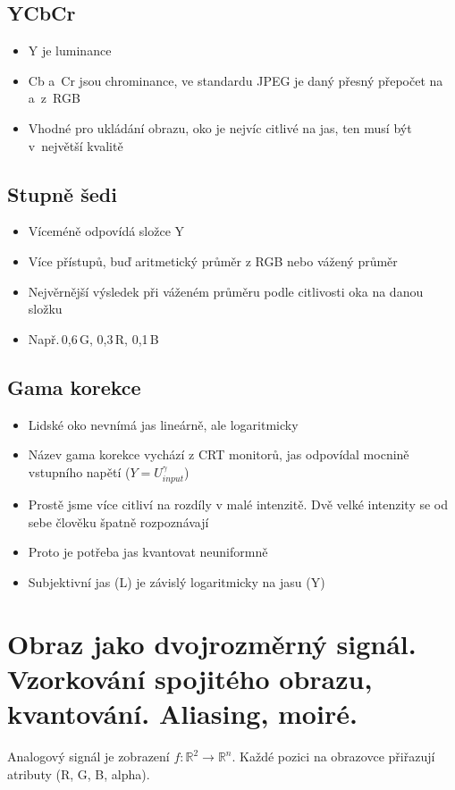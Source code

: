 \subsection{YCbCr}
\begin{itemize}
    \item Y je luminance
    \item Cb a~Cr jsou chrominance, ve standardu JPEG je daný přesný přepočet na a~z~RGB
    \item Vhodné pro ukládání obrazu, oko je nejvíc citlivé na jas, ten musí být v~největší kvalitě
\end{itemize}

\subsection{Stupně šedi}
\begin{itemize}
    \item Víceméně odpovídá složce Y
    \item Více přístupů, buď aritmetický průměr z RGB nebo vážený průměr
    \item Nejvěrnější výsledek při váženém průměru podle citlivosti oka na danou složku
    \item Např.\,0,6\,G, 0,3\,R, 0,1\,B
\end{itemize}

\subsection{Gama korekce}
\begin{itemize}
    \item Lidské oko nevnímá jas lineárně, ale logaritmicky
    \item Název gama korekce vychází z CRT monitorů, jas odpovídal mocnině vstupního napětí (\(Y=U_{input}^\gamma\))
    \item Prostě jsme více citliví na rozdíly v malé intenzitě. Dvě velké intenzity se od sebe člověku špatně rozpoznávají
    \item Proto je potřeba jas kvantovat neuniformně
    \item Subjektivní jas (L) je závislý logaritmicky na jasu (Y)
\end{itemize}


\section{Obraz jako dvojrozměrný signál. Vzorkování spojitého obrazu, kvantování. Aliasing, moiré.}
Analogový signál je zobrazení \(f:\mathbb{R}^2\rightarrow\mathbb{R}^n\). Každé pozici na obrazovce přiřazují atributy (R, G, B, alpha).

